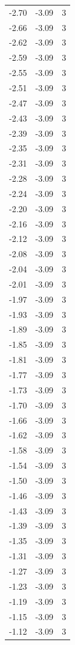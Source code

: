 \begin{longtable}{lrr}
  -2.70 & -3.09 & 3 \\
  -2.66 & -3.09 & 3 \\
  -2.62 & -3.09 & 3 \\
  -2.59 & -3.09 & 3 \\
  -2.55 & -3.09 & 3 \\
  -2.51 & -3.09 & 3 \\
  -2.47 & -3.09 & 3 \\
  -2.43 & -3.09 & 3 \\
  -2.39 & -3.09 & 3 \\
  -2.35 & -3.09 & 3 \\
  -2.31 & -3.09 & 3 \\
  -2.28 & -3.09 & 3 \\
  -2.24 & -3.09 & 3 \\
  -2.20 & -3.09 & 3 \\
  -2.16 & -3.09 & 3 \\
  -2.12 & -3.09 & 3 \\
  -2.08 & -3.09 & 3 \\
  -2.04 & -3.09 & 3 \\
  -2.01 & -3.09 & 3 \\
  -1.97 & -3.09 & 3 \\
  -1.93 & -3.09 & 3 \\
  -1.89 & -3.09 & 3 \\
  -1.85 & -3.09 & 3 \\
  -1.81 & -3.09 & 3 \\
  -1.77 & -3.09 & 3 \\
  -1.73 & -3.09 & 3 \\
  -1.70 & -3.09 & 3 \\
  -1.66 & -3.09 & 3 \\
  -1.62 & -3.09 & 3 \\
  -1.58 & -3.09 & 3 \\
  -1.54 & -3.09 & 3 \\
  -1.50 & -3.09 & 3 \\
  -1.46 & -3.09 & 3 \\
  -1.43 & -3.09 & 3 \\
  -1.39 & -3.09 & 3 \\
  -1.35 & -3.09 & 3 \\
  -1.31 & -3.09 & 3 \\
  -1.27 & -3.09 & 3 \\
  -1.23 & -3.09 & 3 \\
  -1.19 & -3.09 & 3 \\
  -1.15 & -3.09 & 3 \\
  -1.12 & -3.09 & 3 \\

\end{longtable}
